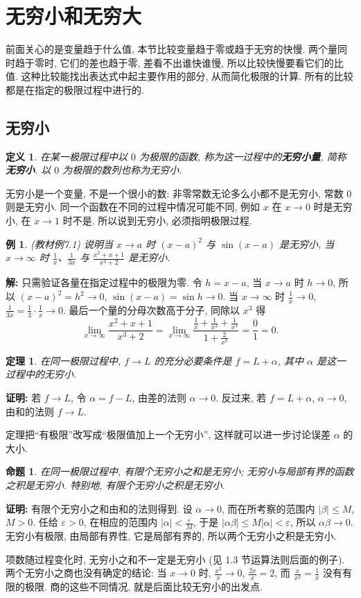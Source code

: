 \documentclass[UTF8,openany]{ctexbook}
\theoremstyle{chinesetextbook}
\newtheorem{definition}{定义}[section]
\newtheorem{example}{例}[section]
\newtheorem{proposition}{命题}[section]
\newenvironment{cnproof}{\par\indent\textbf{证明:} \ignorespaces}{\par}
\newenvironment{cnsolution}{\par\indent\textbf{解:} \ignorespaces}{\par}
\newtheorem*{theoremsingle}{定理}
\begin{document}
\section{无穷小和无穷大}
前面关心的是变量趋于什么值, 本节比较变量趋于零或趋于无穷的快慢. 两个量同时趋于零时, 它们的差也趋于零, 差看不出谁快谁慢, 所以比较快慢要看它们的比值. 这种比较能找出表达式中起主要作用的部分, 从而简化极限的计算. 所有的比较都是在指定的极限过程中进行的.
\subsection{无穷小}
\begin{definition}
在某一极限过程中以 $0$ 为极限的函数, 称为这一过程中的\textbf{无穷小量}, 简称\textbf{无穷小}. 以 $0$ 为极限的数列也称为无穷小.
\end{definition}
无穷小是一个变量, 不是一个很小的数: 非零常数无论多么小都不是无穷小, 常数 $0$ 则是无穷小. 同一个函数在不同的过程中情况可能不同, 例如 $x$ 在 $x\to0$ 时是无穷小, 在 $x\to1$ 时不是. 所以说到无穷小, 必须指明极限过程.
\begin{example}
\textnormal{(教材例7.1)} 说明当 $x\to a$ 时 $(x-a)^2$ 与 $\sin(x-a)$ 是无穷小, 当 $x\to\infty$ 时 $\displaystyle\frac1x$、$\displaystyle\frac1{3x}$ 与 $\displaystyle\frac{x^2+x+1}{x^3+2}$ 是无穷小.
\end{example}
\begin{cnsolution}
只需验证各量在指定过程中的极限为零. 令 $h=x-a$, 当 $x\to a$ 时 $h\to0$, 所以 $(x-a)^2=h^2\to0$, $\sin(x-a)=\sin h\to0$. 当 $x\to\infty$ 时 $\displaystyle\frac1x\to0$, $\displaystyle\frac1{3x}=\frac13\cdot\frac1x\to0$. 最后一个量的分母次数高于分子, 同除以 $x^3$ 得
\[
\lim_{x\to\infty}\frac{x^2+x+1}{x^3+2}=\lim_{x\to\infty}\frac{\frac1x+\frac1{x^2}+\frac1{x^3}}{1+\frac2{x^3}}=\frac01=0.
\]
\end{cnsolution}
\begin{theoremsingle}
在同一极限过程中, $f\to L$ 的充分必要条件是 $f=L+\alpha$, 其中 $\alpha$ 是这一过程中的无穷小.
\end{theoremsingle}
\begin{cnproof}
若 $f\to L$, 令 $\alpha=f-L$, 由差的法则 $\alpha\to0$. 反过来, 若 $f=L+\alpha$, $\alpha\to0$, 由和的法则 $f\to L$.
\end{cnproof}
定理把“有极限”改写成“极限值加上一个无穷小”, 这样就可以进一步讨论误差 $\alpha$ 的大小.
\begin{proposition}
在同一极限过程中, 有限个无穷小之和是无穷小; 无穷小与局部有界的函数之积是无穷小. 特别地, 有限个无穷小之积是无穷小.
\end{proposition}
\begin{cnproof}
有限个无穷小之和由和的法则得到. 设 $\alpha\to0$, 而在所考察的范围内 $|\beta|\le M$, $M>0$. 任给 $\varepsilon>0$, 在相应的范围内 $\displaystyle|\alpha|<\frac\varepsilon M$, 于是 $|\alpha\beta|\le M|\alpha|<\varepsilon$, 所以 $\alpha\beta\to0$. 无穷小有极限, 由局部有界性, 它是局部有界的, 所以两个无穷小之积是无穷小.
\end{cnproof}
项数随过程变化时, 无穷小之和不一定是无穷小 (见 1.3 节运算法则后面的例子). 两个无穷小之商也没有确定的结论: 当 $x\to0$ 时, $\displaystyle\frac{x^2}x\to0$, $\displaystyle\frac{2x}x=2$, 而 $\displaystyle\frac x{x^2}=\frac1x$ 没有有限的极限. 商的这些不同情况, 就是后面比较无穷小的出发点.
\end{document}
